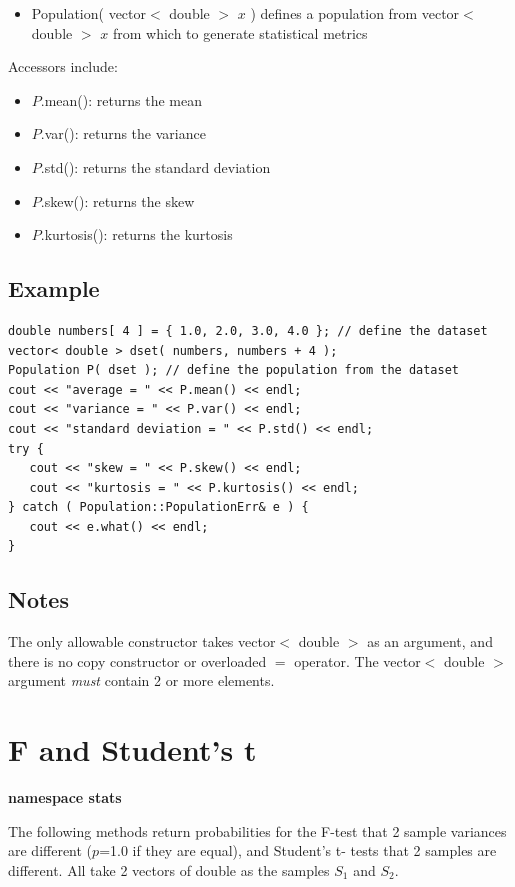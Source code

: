 \documentclass{report}
\begin{document}
\begin{itemize}
\item Population( vector$<$ double $>$ $x$ ) defines a population from
      vector$<$ double $>$ $x$ from which to generate statistical
      metrics
\end{itemize}

Accessors include:
\begin{itemize}
\item $P$.mean(): returns the mean
\item $P$.var(): returns the variance
\item $P$.std(): returns the standard deviation
\item $P$.skew(): returns the skew
\item $P$.kurtosis(): returns the kurtosis
\end{itemize}

\subsection{Example}
\begin{verbatim}
double numbers[ 4 ] = { 1.0, 2.0, 3.0, 4.0 }; // define the dataset
vector< double > dset( numbers, numbers + 4 );
Population P( dset ); // define the population from the dataset
cout << "average = " << P.mean() << endl;
cout << "variance = " << P.var() << endl;
cout << "standard deviation = " << P.std() << endl;
try {
   cout << "skew = " << P.skew() << endl;
   cout << "kurtosis = " << P.kurtosis() << endl;
} catch ( Population::PopulationErr& e ) {
   cout << e.what() << endl;
}
\end{verbatim}

\subsection{Notes}
The only allowable constructor takes vector$<$ double $>$ as an
argument, and there is no copy constructor or overloaded $=$ operator.
The vector$<$ double $>$ argument {\em must} contain 2 or more
elements.

\section{F and Student's t}

{\bf namespace stats}

The following methods return probabilities for the F-test that 2
sample
variances are different ($p$=1.0 if they are equal), and Student's t-
tests
that 2 samples are different.  All take 2 vectors of double as the
samples
$S_1$ and $S_2$.
\end{document}
